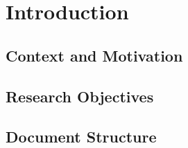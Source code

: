 \newcommand{\novathesis}{\emph{novathesis}}
\newcommand{\novathesisclass}{\texttt{novathesis.cls}}


\chapter{Introduction}
\label{cha:introduction}

\section{Context and Motivation} %
\label{sec:context_and_motivation}


\section{Research Objectives} %
\label{sec:research_objectives}


\section{Document Structure} %
\label{sec:document_structure}
